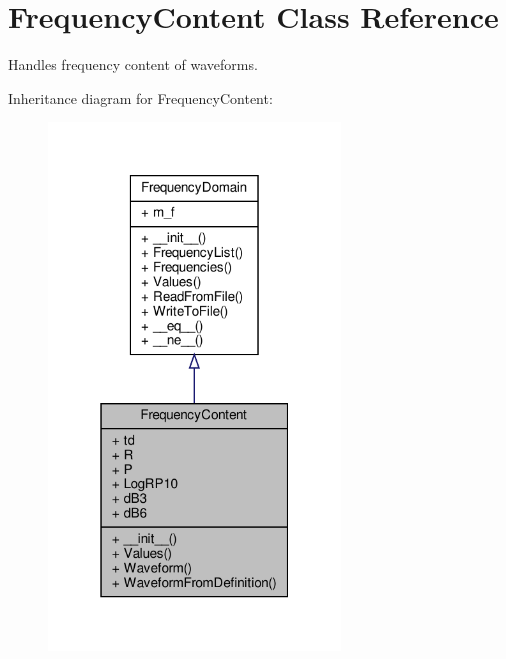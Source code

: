 \hypertarget{classSignalIntegrity_1_1FrequencyDomain_1_1FrequencyContent_1_1FrequencyContent}{}\section{Frequency\+Content Class Reference}
\label{classSignalIntegrity_1_1FrequencyDomain_1_1FrequencyContent_1_1FrequencyContent}


Handles frequency content of waveforms.  




Inheritance diagram for Frequency\+Content\+:\nopagebreak
\begin{figure}[H]
\begin{center}
\leavevmode
\includegraphics[width=220pt]{classSignalIntegrity_1_1FrequencyDomain_1_1FrequencyContent_1_1FrequencyContent__inherit__graph}
\end{center}
\end{figure}


